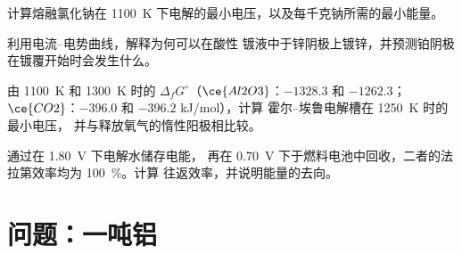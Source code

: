 \begin{exercise}[$\star\star$]\label{exo:b2:batteries-electrolysis:9}
计算熔融氯化钠在
\qty{1100}{K} 下电解的最小电压，以及每千克钠所需的最小能量。
\end{exercise}

\begin{exercise}[$\star\star\star$]\label{exo:b2:batteries-electrolysis:10}
利用电流–电势曲线，解释为何可以在酸性
镀液中于锌阴极上镀锌，并预测铂阴极
在镀覆开始时会发生什么。
\end{exercise}

\begin{exercise}[$\star\star\star$]\label{exo:b2:batteries-electrolysis:11}
由 \qty{1100}{K} 和 \qty{1300}{K} 时的 $\Delta_f G^\circ$（$\ce{Al2O3}$：$-1328.3$ 和
$-1262.3$；$\ce{CO2}$：$-396.0$ 和 $-396.2$ \unit{kJ/mol}），计算
霍尔–埃鲁电解槽在 \qty{1250}{K} 时的最小电压，
并与释放氧气的惰性阳极相比较。
\end{exercise}

\begin{exercise}[$\star\star\star$]\label{exo:b2:batteries-electrolysis:12}
通过在 \qty{1.80}{V} 下电解水储存电能，
再在 \qty{0.70}{V} 下于燃料电池中回收，二者的法拉第效率均为 100~\%。计算
往返效率，并说明能量的去向。
\end{exercise}

\section{问题：一吨铝}

